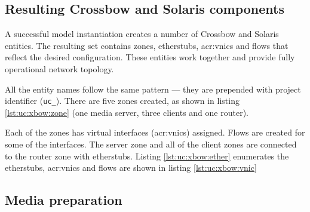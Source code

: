 \documentclass[11pt]{book}
\begin{document}
      
      
      \subsection{Resulting Crossbow and Solaris components}
      \label{sub:uc:xbow}

        A successful model instantiation creates a number of Crossbow and Solaris entities. The resulting set contains
        zones, etherstubs, \gls{acr:vnic}s and flows that reflect the desired configuration. These entities work together and
        provide fully operational network topology.

        All the entity names follow the same pattern --- they are prepended with project identifier (\texttt{uc\_}).
        There are five zones created, as shown in listing \ref{lst:uc:xbow:zone} (one media server, three clients and
        one router). \\

        \noindent
        \begin{minipage}{\textwidth}
          
        \end{minipage}

        Each of the zones has virtual interfaces (\gls{acr:vnic}s) assigned. Flows are created for some of the interfaces. The
        server zone and all of the client zones are connected to the router zone with etherstubs. Listing
        \ref{lst:uc:xbow:ether} enumerates the etherstubs, \gls{acr:vnic}s and flows are shown in listing \ref{lst:uc:xbow:vnic} \\

        \noindent
        \begin{minipage}{\textwidth}
          
        \end{minipage}

        \noindent
        \begin{minipage}{\textwidth}
          
        \end{minipage}


      \subsection{Media preparation}
      \label{sub:}
\end{document}
